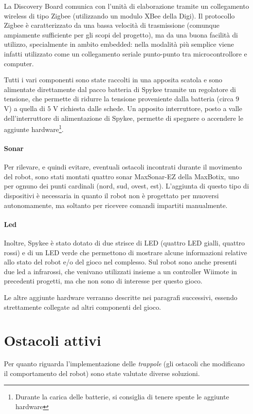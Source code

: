 La Discovery Board comunica con l'unità di elaborazione tramite un collegamento wireless di tipo Zigbee (utilizzando un modulo XBee della Digi). Il protocollo Zigbee è caratterizzato da una bassa velocità di trasmissione (comunque ampiamente sufficiente per gli scopi del progetto), ma da una buona facilità di utilizzo, specialmente in ambito embedded: nella modalità più semplice viene infatti utilizzato come un collegamento seriale punto-punto tra microcontrollore e computer.

Tutti i vari componenti sono state raccolti in una apposita scatola e sono alimentate direttamente dal pacco batteria di Spykee tramite un regolatore di tensione, che permette di ridurre la tensione proveniente dalla batteria (circa $9$ V) a quella di $5$ V richiesta dalle schede. Un apposito interruttore, posto a valle dell'interruttore di alimentazione di Spykee, permette di spegnere o accendere le aggiunte hardware\footnote{Durante la carica delle batterie, si consiglia di tenere spente le aggiunte hardware}.

\paragraph{Sonar} Per rilevare, e quindi evitare, eventuali ostacoli incontrati durante il movimento del robot, sono stati montati quattro sonar MaxSonar\textregistered-EZ della MaxBotix, uno per ognuno dei punti cardinali (nord, sud, ovest, est). L'aggiunta di questo tipo di dispositivi è necessaria in quanto il robot non è progettato per muoversi autonomamente, ma soltanto per ricevere comandi impartiti manualmente. 

\paragraph{Led} Inoltre, Spykee è stato dotato di due strisce di LED (quattro LED gialli, quattro rossi) e di un LED verde che permettono di mostrare alcune informazioni relative allo stato del robot e/o del gioco nel complesso. Sul robot sono anche presenti due led a infrarossi, che venivano utilizzati insieme a un controller Wiimote in precedenti progetti, ma che non sono di interesse per questo gioco. 

Le altre aggiunte hardware verranno descritte nei paragrafi successivi, essendo strettamente collegate ad altri componenti del gioco.

\section{Ostacoli attivi}
Per quanto riguarda l'implementazione delle \emph{trappole} (gli ostacoli che modificano il comportamento del robot) sono state valutate diverse soluzioni.

